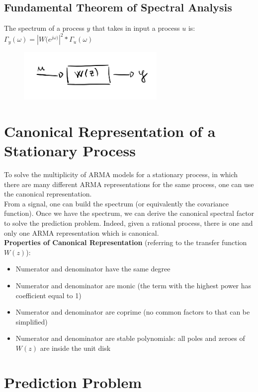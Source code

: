 \documentclass[10pt,a4paper]{article}
\begin{document}
\subsection{Fundamental Theorem of Spectral Analysis}
The spectrum of a process $y$ that takes in input a process $u$ is:
\center 
$\Gamma_y(\omega)=|W(e^{j \omega)}|^2*\Gamma_u(\omega)$
\\
 \begin{figure}[h!]
 \hfill \includegraphics[width=200pt]{images/spectrum-theorem.png}\hspace*{\fill}
  \label{fig:spectrum-theorem}
\end{figure}
\raggedright
\section{Canonical Representation of a Stationary Process}
To solve the multiplicity of ARMA models for a stationary process, in which there are many different ARMA representations for the same process, one can use the canonical representation. \\
From a signal, one can build the spectrum (or equivalently the covariance function). Once we have the spectrum, we can derive the canonical spectral factor to solve the prediction problem. Indeed, given a rational process, there is one and only one ARMA representation which is canonical. \\
\pagebreak
\textbf{Properties of Canonical Representation} (referring to the transfer function $W(z)$):
\begin{itemize}
	\item Numerator and denominator have the same degree
	\item Numerator and denominator are monic (the term with the highest power has coefficient equal to 1)
	\item Numerator and denominator are coprime (no common factors to that can be simplified)
	\item Numerator and denominator are stable polynomials: all poles and zeroes of $W(z)$ are inside the unit disk
\end{itemize}
\section{Prediction Problem}
\end{document}
